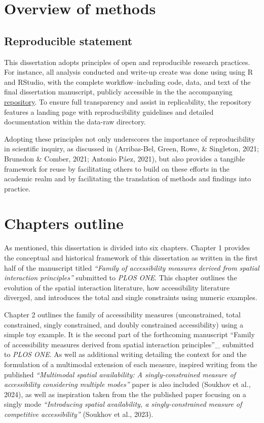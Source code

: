 \documentclass[
11pt, %
oneside, %
english, %
singlespacing, %
]{macthesis} %
\begin{document}
\section{Overview of methods}\label{overview-of-methods}

\subsection{Reproducible statement}\label{reproducible-statement}

This dissertation adopts principles of open and reproducible research practices. For instance, all analysis conducted and write-up create was done using using R and RStudio, with the complete workflow--including code, data, and text of the final dissertation manuscript, publicly accessible in the the accompanying \href{https://github.com/soukhova/Dissertation}{repository}. To ensure full transparency and assist in replicability, the repository features a landing page with reproducibility guidelines and detailed documentation within the data-raw directory.

Adopting these principles not only underscores the importance of reproducibility in scientific inquiry, as discussed in (Arribas-Bel, Green, Rowe, \& Singleton, 2021; Brunsdon \& Comber, 2021; Antonio Páez, 2021), but also provides a tangible framework for reuse by facilitating others to build on these efforts in the academic realm and by facilitating the translation of methods and findings into practice.

\section{Chapters outline}\label{chapters-outline}

As mentioned, this dissertation is divided into six chapters. Chapter 1 provides the conceptual and historical framework of this dissertation as written in the first half of the manuscript titled \emph{``Family of accessibility measures derived from spatial interaction principles''} submitted to \emph{PLOS ONE}. This chapter outlines the evolution of the spatial interaction literature, how accessibility literature diverged, and introduces the total and single constraints using numeric examples.

Chapter 2 outlines the family of accessibility measures (unconstrained, total constrained, singly constrained, and doubly constrained accessibility) using a simple toy example. It is the second part of the forthcoming manuscript ``Family of accessibility measures derived from spatial interaction principles''\_ submitted to \emph{PLOS ONE}. As well as additional writing detailing the context for and the formulation of a multimodal extension of each measure, inspired writing from the published \emph{``Multimodal spatial availability: A singly-constrained measure of accessibility considering multiple modes''} paper is also included (Soukhov et al., 2024), as well as inspiration taken from the the published paper focusing on a singly mode \emph{``Introducing spatial availability, a singly-constrained measure of competitive accessibility''} (Soukhov et al., 2023).
\end{document}
